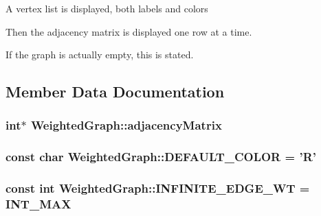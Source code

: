 \begin{DoxyEnumerate}
\item \-A vertex list is displayed, both labels and colors
\item \-Then the adjacency matrix is displayed one row at a time.
\item \-If the graph is actually empty, this is stated.
\end{DoxyEnumerate}


\begin{DoxyCode}
\end{DoxyCode}
 

\subsection{\-Member \-Data \-Documentation}
\hypertarget{class_weighted_graph_aed50ef32c1c87bb10ca5d1bbc182880a}{
\subsubsection[{adjacency\-Matrix}]{\setlength{\rightskip}{0pt plus 5cm}int$\ast$ {\bf \-Weighted\-Graph\-::adjacency\-Matrix}}}\label{class_weighted_graph_aed50ef32c1c87bb10ca5d1bbc182880a}
\hypertarget{class_weighted_graph_ad1854c7cf163167c7cebe7a2f5ebe9d6}{
\subsubsection[{\-D\-E\-F\-A\-U\-L\-T\-\_\-\-C\-O\-L\-O\-R}]{\setlength{\rightskip}{0pt plus 5cm}const char {\bf \-Weighted\-Graph\-::\-D\-E\-F\-A\-U\-L\-T\-\_\-\-C\-O\-L\-O\-R} = '\-R'}}\label{class_weighted_graph_ad1854c7cf163167c7cebe7a2f5ebe9d6}
\hypertarget{class_weighted_graph_ab41b338adfc1ebc080cfca0e0b85de4b}{
\subsubsection[{\-I\-N\-F\-I\-N\-I\-T\-E\-\_\-\-E\-D\-G\-E\-\_\-\-W\-T}]{\setlength{\rightskip}{0pt plus 5cm}const int {\bf \-Weighted\-Graph\-::\-I\-N\-F\-I\-N\-I\-T\-E\-\_\-\-E\-D\-G\-E\-\_\-\-W\-T} = \-I\-N\-T\-\_\-\-M\-A\-X}}\label{class_weighted_graph_ab41b338adfc1ebc080cfca0e0b85de4b}
